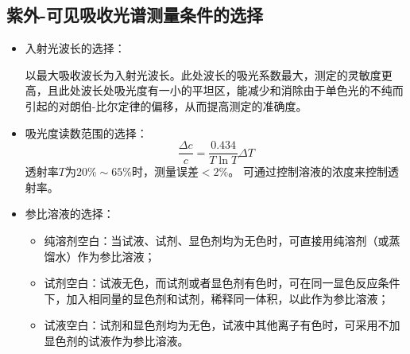 \subsection{紫外-可见吸收光谱测量条件的选择}
\begin{itemize}
    \item 入射光波长的选择：
    
    以最大吸收波长为入射光波长。此处波长的吸光系数最大，测定的灵敏度更高，且此处波长处吸光度有一小的平坦区，能减少和消除由于单色光的不纯而引起的对朗伯-比尔定律的偏移，从而提高测定的准确度。
    
    \item 吸光度读数范围的选择：
    \begin{equation*}
        \frac{\Delta c}{c}=\frac{0.434}{T \ln T}\Delta T
    \end{equation*}
    透射率$T$为$20\%\sim 65\%$时，测量误差$<2\%$。
    可通过控制溶液的浓度来控制透射率。
    
    \item 参比溶液的选择：
     \begin{itemize}
        \item 纯溶剂空白：当试液、试剂、显色剂均为无色时，可直接用纯溶剂（或蒸馏水）作为参比溶液；
        \item  试剂空白：试液无色，而试剂或者显色剂有色时，可在同一显色反应条件下，加入相同量的显色剂和试剂，稀释同一体积，以此作为参比溶液；
        \item  试液空白：试剂和显色剂均为无色，试液中其他离子有色时，可采用不加显色剂的试液作为参比溶液。
    \end{itemize}

\end{itemize}    